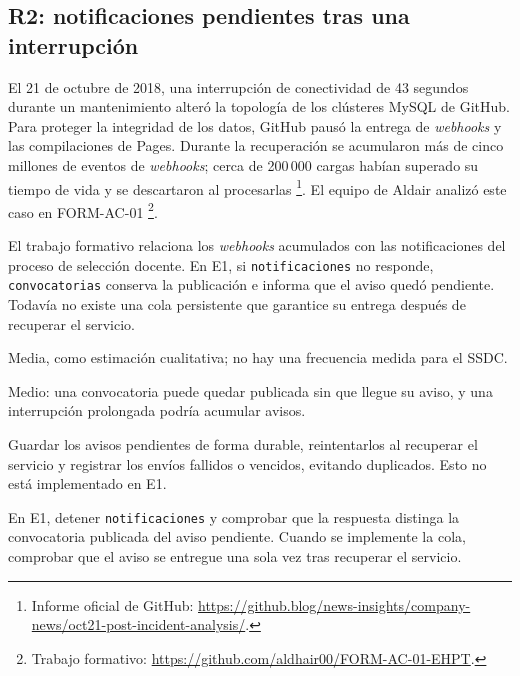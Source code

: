 \subsection{R2: notificaciones pendientes tras una interrupción}

\begin{description}[leftmargin=!,labelwidth=4.2cm,style=nextline]
  \item[Incidente de origen]
    El 21 de octubre de 2018, una interrupción de conectividad de
    43 segundos durante un mantenimiento alteró la topología de los
    clústeres MySQL de GitHub. Para proteger la integridad de los datos,
    GitHub pausó la entrega de \textit{webhooks} y las compilaciones de
    Pages. Durante la recuperación se acumularon más de cinco millones
    de eventos de \textit{webhooks}; cerca de 200\,000 cargas habían
    superado su tiempo de vida y se descartaron al procesarlas
    \footnote{Informe oficial de GitHub:
    \url{https://github.blog/news-insights/company-news/oct21-post-incident-analysis/}.}.
    El equipo de Aldair analizó este caso en FORM-AC-01
    \footnote{Trabajo formativo:
    \url{https://github.com/aldhair00/FORM-AC-01-EHPT}.}.

  \item[Relación con el SSDC]
    El trabajo formativo relaciona los \textit{webhooks} acumulados
    con las notificaciones del proceso de selección docente. En E1,
    si \texttt{notificaciones} no responde, \texttt{convocatorias}
    conserva la publicación e informa que el aviso quedó pendiente.
    Todavía no existe una cola persistente que garantice su entrega
    después de recuperar el servicio.

  \item[Probabilidad]
    Media, como estimación cualitativa; no hay una frecuencia medida
    para el SSDC.

  \item[Impacto]
    Medio: una convocatoria puede quedar publicada sin que llegue
    su aviso, y una interrupción prolongada podría acumular avisos.

  \item[Medida propuesta]
    Guardar los avisos pendientes de forma durable, reintentarlos
    al recuperar el servicio y registrar los envíos fallidos o vencidos,
    evitando duplicados. Esto no está implementado en E1.

  \item[Verificación]
    En E1, detener \texttt{notificaciones} y comprobar que la respuesta
    distinga la convocatoria publicada del aviso pendiente. Cuando
    se implemente la cola, comprobar que el aviso se entregue una sola
    vez tras recuperar el servicio.
\end{description}
